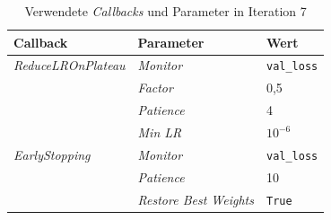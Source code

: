 \documentclass[
    a4paper,        %
    11pt,           %
    ngerman,        %
    parskip=half,   %
    listof=totoc,   %
    bibliography=totoc %
]{scrartcl}
\begin{document}
\begin{table}[H]
    \centering
    \caption{Verwendete \textit{Callbacks} und Parameter in Iteration 7}
    \label{tab:callbacks_iter7}
    \begin{tabular}{lll}
        \toprule
        \textbf{Callback} & \textbf{Parameter} & \textbf{Wert} \\
        \midrule
        \textit{ReduceLROnPlateau} & \textit{Monitor} & \texttt{val\_loss} \\
                          & \textit{Factor} & 0,5 \\
                          & \textit{Patience} & 4 \\
                          & \textit{Min LR} & $10^{-6}$ \\
        \midrule
        \textit{EarlyStopping}     & \textit{Monitor} & \texttt{val\_loss} \\
                          & \textit{Patience} & 10 \\
                          & \textit{Restore Best Weights} & \texttt{True} \\
        \bottomrule
    \end{tabular}
\end{table}
\end{document}
